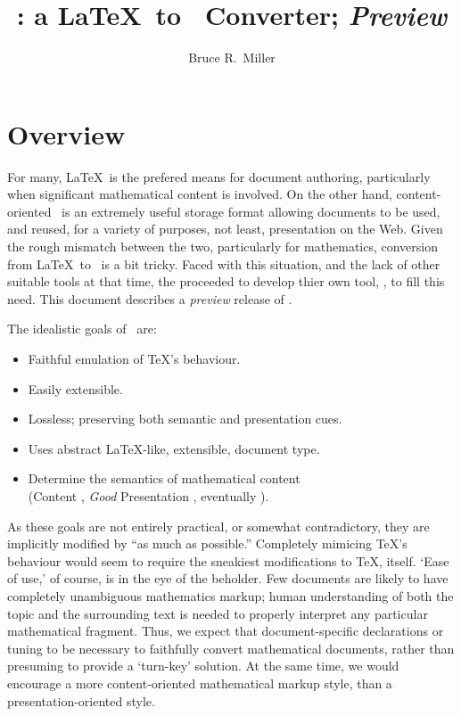 \documentclass{article}
\title{\LaTeXML: a \LaTeX\ to \XML\ Converter; \emph{Preview}}
\author{Bruce R.~Miller}
\begin{document}
\maketitle
\section{Overview}
For many, \LaTeX\ is the prefered means for document authoring, particularly when
significant mathematical content is involved.
On the other hand, content-oriented \XML\ is an extremely useful storage format
allowing documents to be used, and reused, for a variety of purposes, not least, 
presentation on the Web.  Given the rough mismatch between the two,
particularly for mathematics, conversion  from \LaTeX\ to \XML\ is a bit tricky.
Faced with this situation, and the lack of other suitable tools at that time,
the 
proceeded to develop thier own tool, \LaTeXML, to fill this need.
This document describes a \emph{preview} release of \LaTeXML.

The idealistic goals of \LaTeXML\ are:
\begin{itemize}
\item Faithful emulation of TeX's behaviour.
\item Easily extensible.
\item Lossless; preserving both semantic and presentation cues.
\item Uses abstract \LaTeX-like, extensible, document type.
\item Determine the semantics of mathematical content\\
    (Content \MathML, \emph{Good} Presentation \MathML, eventually \OpenMath).
\end{itemize}

As these goals are not entirely practical, or somewhat contradictory,
they are implicitly modified by ``as much as possible.''
Completely mimicing \TeX's behaviour would seem to require the sneakiest modifications
to \TeX, itself.  `Ease of use,' of course, is in the eye of the beholder.
Few documents are likely to have completely unambiguous mathematics markup; 
human understanding of both the topic and the surrounding text is needed to
properly interpret any particular mathematical fragment.
Thus, we expect that document-specific declarations or tuning to be necessary
to faithfully convert mathematical documents, rather than presuming to
provide a `turn-key' solution. At the same time, we would encourage
a more content-oriented mathematical markup style, than a presentation-oriented style.
\end{document}
